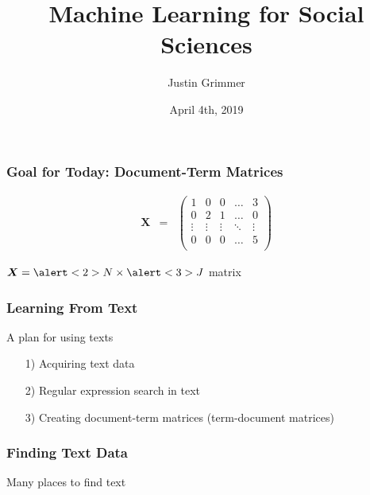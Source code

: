 \documentclass{beamer}
\title[Machine Learning] %
{Machine Learning for Social Sciences}
\author{Justin Grimmer}
\institute[Stanford]{Professor\\Department of Political Science \\  Stanford University}
\date{April 4th, 2019}
\numberwithin{equation}{section}
\begin{document}
\begin{frame}
\titlepage
\end{frame}




\begin{frame}
\frametitle{Goal for Today: Document-Term Matrices}

\begin{eqnarray}
\boldsymbol{X} & = & \begin{pmatrix}
1 & 0 & 0 & \hdots & 3 \\
0 & 2 & 1 & \hdots & 0 \\
\vdots & \vdots & \vdots & \ddots & \vdots \\
0 & 0 & 0 & \hdots & 5 \\
\end{pmatrix} \nonumber
\end{eqnarray}


$\boldsymbol{X} = \alert<2>{N} \times \alert<3>{J}$ matrix

\begin{itemize}
\end{itemize}


\pause \pause


\end{frame}






\begin{frame}
\frametitle{Learning From Text}


A plan for using texts
\begin{itemize}
\item[1)] Acquiring text data
\item[2)] Regular expression search in text
\item[3)] Creating document-term matrices (term-document matrices)
\end{itemize}


\end{frame}






\begin{frame}
\frametitle{Finding Text Data }
Many places to find text  \pause


 \pause
{}
\end{frame}
\end{document}
